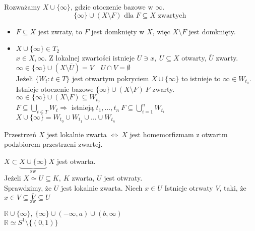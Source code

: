 \begin{dd} 
    Rozważamy $X \cup \{ \infty \}$, gdzie otoczenie bazowe w $\infty$.  
    \[ \{ \infty \} \cup (X \setminus F) \text{ dla } F \subseteq X \text{ zwartych }\]
    \begin{itemize} 
        \item $F \subseteq X$ jest zwraty, to $F$ jest domknięty w $X$, więc $X \setminus F$ jest domknięty. 
        \item $X \cup \{ \infty \} \in T_2$ \\ 
            $x \in X,\infty$. Z lokalnej zwartości istnieje $U \ni x,\ U \subseteq X$ 
            otwarty, $\overline U$ zwarty. \\ 
            $\infty \in \{ \infty\} \cup (X \setminus \overline U) = V \quad U \cap V = 
            \emptyset$ \\ 
            Jeżeli $\{ W_t: t \in T\}$ jest otwartym pokryciem $X \cup \{ \infty \}$ to 
            istnieje to $\infty \in W_{t_0}$. Istnieje otoczenie bazowe $\{ \infty \} 
            \cup (X \setminus F) \ F$ zwarty. \\ 
            $\infty \in \{ \infty \} \cup (X \setminus F) \subseteq W_{t_0}$ \\ 
            $F \subseteq \bigcup\limits_{t \in T} W_t \Rightarrow$ istnieją $t_1,\ldots,
            t_n \ F \subseteq \bigcup\limits_{i = 1}^n W_{t_i}$ \\ 
            $X \cup \{ \infty \} = W_{t_0} \cup W_{t_1} \cup \ldots \cup W_{t_n}$ 
    \end{itemize} 
\end{dd} 
\begin{wn} 
    Przestrzeń $X$ jest lokalnie zwarta $\Leftrightarrow \ X$ jest homemorfizmam z
    otwartm podzbiorem przestrzeni zwartej. 
\end{wn} 
\begin{dd} 
    $X \subset \underbrace{X \cup \{\infty\}}_{\text{zw}} \ X$ jest otwarta. \\ 
    Jeżeli $X \simeq U \subseteq K,\ K$ zwarta, $U$ jest otwraty. \\ 
    Sprawdzimy, że $U$ jest lokalnie zwarta. Niech $x \in U$ Istnieje otrwaty $V$, taki, 
    że $x \in V \subseteq \underset{\text{zw}}{\overline V} \subseteq U$
\end{dd} 
\begin{prz} 
    $\mathbb{R} \cup \{ \infty \},\ \{ \infty \} \cup (-\infty, a) \cup (b,\infty)$ \\ 
    $\mathbb{R} \simeq S^1 \setminus \{(0,1)\}$  
\end{prz} 
